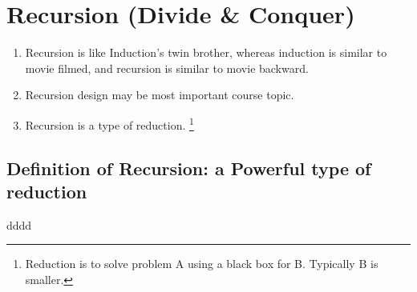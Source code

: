 \section{Recursion (Divide \& Conquer)}
\begin{enumerate}
\item Recursion is like Induction's twin brother, whereas induction is similar to movie filmed, and recursion is similar to movie backward.
\item Recursion design may be most important course topic.
\item Recursion is a type of reduction. \footnote{Reduction is to solve problem A using a black box for B. Typically B is smaller.}
\end{enumerate}

\subsection{Definition of Recursion: a Powerful type of reduction}
 dddd
